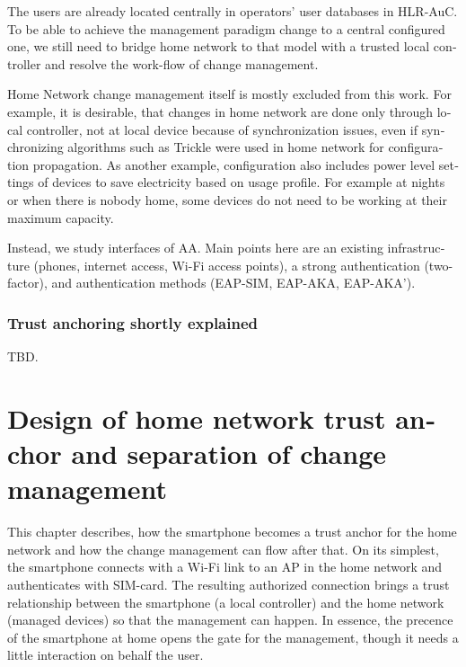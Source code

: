 \documentclass[12pt,a4paper,english]{tutthesis}
\begin{document}
\begin{otherlanguage}{english}
The users are already located centrally in operators' user databases
in HLR-AuC.  To be able
to achieve the management paradigm change to a central configured one,
we still need to bridge home network to that model with a trusted local controller
and resolve the work-flow of change management.


Home Network change management itself is mostly excluded from this work.
For example, 
it is desirable, that changes in home network are done only through
local controller, not at local device because of
synchronization issues, even 
if synchronizing algorithms such as Trickle\cite{rfc6206} were used in
home network for configuration propagation. As another example,
configuration also includes
power level settings of devices to save electricity based on usage
profile. For example at nights or when there is nobody home, some
devices do not need to be working at their maximum capacity. 

Instead, we study interfaces of AA.  Main points here are an existing
infrastructure (phones, internet access, Wi-Fi access points),  a strong
authentication (two-factor), and authentication methods
(EAP-SIM, EAP-AKA, EAP-AKA').

\subsection{Trust anchoring shortly explained}
\label{sec-3-2-1}

TBD.

\chapter{Design of home network trust anchor and separation of change management}
\label{sec-4}





This chapter describes, how the smartphone becomes a trust anchor for
the home network and how the change management can flow after that.
On its simplest, the smartphone connects with a Wi-Fi link to an
AP in the home network and authenticates with SIM-card.
The resulting authorized connection brings a trust relationship
between the smartphone (a local controller)
and the home network (managed devices) so that the 
management can happen. 
In essence, the precence of the smartphone at home
opens the gate for the management, though it needs a little
interaction on behalf the user.




\end{otherlanguage}
\end{document}
